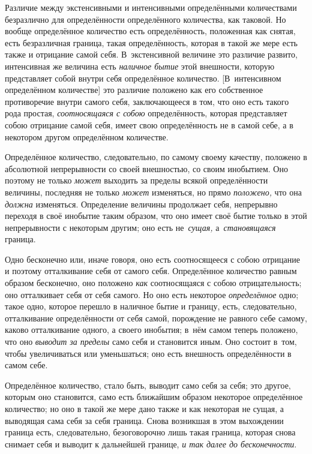 Различие между экстенсивными и интенсивными определёнными количествами
безразлично для определённости определённого количества, как таковой. Но вообще
определённое количество есть определённость, положенная как снятая, есть
безразличная граница, такая определённость, которая в такой же мере есть также
и отрицание самой себя. В~экстенсивной величине это различие развито,
интенсивная же величина есть {\em наличное бытие} этой внешности, которую
представляет собой внутри себя определённое количество. [В~интенсивном
определённом количестве] это различие положено как его собственное противоречие
внутри самого себя, заключающееся в том, что оно есть такого рода простая,
{\em соотносящаяся с собою} определённость, которая представляет собою
отрицание самой себя, имеет свою определённость не в самой себе, а в некотором другом
определённом количестве.

Определённое количество, следовательно, по самому своему качеству, положено
в абсолютной непрерывности со своей внешностью, со своим инобытием. Оно поэтому
не только {\em может} выходить за пределы всякой определённости величины,
последняя не только {\em может} изменяться, но прямо {\em положено,} что она
{\em должна} изменяться. Определение величины продолжает себя,
непрерывно переходя в своё инобытие таким образом, что оно имеет своё бытие
только в этой непрерывности с некоторым другим; оно есть не~{\em сущая,}
а~{\em становящаяся} граница.

Одно бесконечно или, иначе говоря, оно есть соотносящееся с собою отрицание и
поэтому отталкивание себя от самого себя. Определённое количество равным
образом бесконечно, оно положено {\em как} соотносящаяся с собою отрицательность; оно
отталкивает себя от себя самого. Но оно есть некоторое {\em определённое} одно;
такое одно, которое перешло в наличное бытие и границу, есть, следовательно,
отталкивание определённости от себя самой, порождение не равного себе самому,
каково отталкивание одного, а своего инобытия; в~нём самом теперь положено, что
оно {\em выводит за пределы} само себя и становится иным. Оно состоит в~том, чтобы
увеличиваться или уменьшаться; оно есть внешность определённости в самом себе.

Определённое количество, стало быть, выводит само себя за себя; это другое,
которым оно становится, само есть ближайшим образом некоторое определённое
количество; но оно в такой же мере дано также и как некоторая не сущая, а
выводящая сама себя за себя граница. Снова возникшая в этом выхождении граница
есть, следовательно, безоговорочно лишь такая граница, которая снова снимает
себя и выводит к дальнейшей границе, {\em и так далее до бесконечности}.

